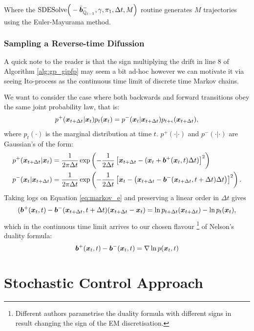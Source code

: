 \documentclass[a4paper,12pt,twoside,openright]{report}
\theoremstyle{definition}
\begin{document}
Where the $\text{SDESolve}\Big(-\bar{{\bm{b}}}^{-}_{{\mathbb{Q}}_{i-1}}, \gamma, \pi_1, \Delta t, M\Big)$ routine generates $M$ trajectories using the Euler-Mayurama method.

\subsubsection{Sampling a Reverse-time Difussion }
A quick note to the reader is that the sign multiplying the drift in line $8$ of Algorithm \ref{alg:gp_gipfp} may seem a bit ad-hoc however we can motivate it via seeing Ito-process as the continuous time limit of discrete time Markov chains.

We want to consider the case where both backwards and forward transitions  obey the same joint probability law, that is:
\begin{align}\label{eq:markov_e}
    p^{+}({\bm{x}}_{t+\Delta t}|{\bm{x}}_t)p_t({\bm{x}}_t)=p^{-}({\bm{x}}_t|{\bm{x}}_{t+\Delta t})p_{t+\epsilon}({\bm{x}}_{t+\Delta t}),
\end{align}
where $p_t(\cdot)$ is the marginal distribution at time $t$. $p^{+}(\cdot|\cdot)$ and $p^{-}(\cdot|\cdot)$ are Gaussian's of the form:
\begin{align*}
p^{+}({\bm{x}}_{t+\Delta t}|{\bm{x}}_t)&=\frac{1}{2\pi \Delta t }\exp\left(-\frac{1}{2\Delta t}\left[{\bm{x}}_{t+\Delta t}-({\bm{x}}_t+{\bm{b}}^{+}({\bm{x}}_t,t)\Delta t)\right]^2\right) \\
p^{-}({\bm{x}}_t|{\bm{x}}_{t+\Delta t})&=\frac{1}{2\pi \Delta t}\exp\left(-\frac{1}{2\Delta t}\left[{\bm{x}}_t-\left({\bm{x}}_{t+\Delta t}-{\bm{b}}^{-}({\bm{x}}_{t+\Delta t},t+\Delta t)\Delta t\right)\right]^2\right).
\end{align*}
Taking logs on Equation \ref{eq:markov_e} and preserving a linear order in $\Delta t$ gives
\begin{align*}
    ({\bm{b}}^+({\bm{x}}_t,t)-{\bm{b}}^-({\bm{x}}_{t+\Delta t},t+\Delta t)({\bm{x}}_{t+\Delta t}-{\bm{x}}_t)=\operatorname{ln} p_{t+\Delta t}({\bm{x}}_{t+\Delta t}) - \operatorname{ln} p_t({\bm{x}}_t), 
\end{align*}
which in the continuous time limit arrives to our chosen flavour \footnote{Different authors parametrise the duality formula with different signs in result changing the sign of the EM discretisation.} of Nelson's duality formula:
\begin{align*}
      {\bm{b}}^+({\bm{x}}_t,t) -{\bm{b}}^-({\bm{x}}_t,t) = \nabla\operatorname{ln} p({\bm{x}}_t, t)
\end{align*}

\section{Stochastic Control Approach}
\end{document}
